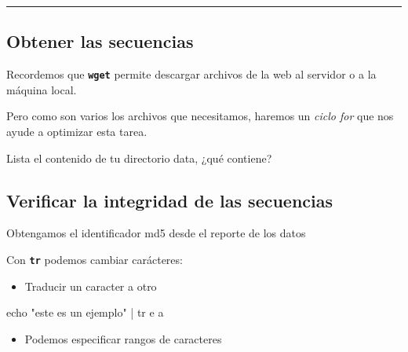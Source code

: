 \documentclass[
]{book}
\newenvironment{Shaded}{\begin{snugshade}}{\end{snugshade}}
\newcommand{\AttributeTok}[1]{\textcolor[rgb]{0.13,0.29,0.53}{#1}}
\newcommand{\ControlFlowTok}[1]{\textcolor[rgb]{0.13,0.29,0.53}{\textbf{#1}}}
\newcommand{\FunctionTok}[1]{\textcolor[rgb]{0.13,0.29,0.53}{\textbf{#1}}}
\newcommand{\KeywordTok}[1]{\textcolor[rgb]{0.13,0.29,0.53}{\textbf{#1}}}
\newcommand{\NormalTok}[1]{#1}
\newcommand{\VariableTok}[1]{\textcolor[rgb]{0.00,0.00,0.00}{#1}}
\providecommand{\tightlist}{%
  \setlength{\itemsep}{0pt}\setlength{\parskip}{0pt}}
\begin{document}
\begin{center}\rule{0.5\linewidth}{0.5pt}\end{center}

\subsection{Obtener las secuencias}\label{obtener-las-secuencias}

Recordemos que \textbf{\texttt{wget}} permite descargar archivos de la web al servidor o a la máquina local.

Pero como son varios los archivos que necesitamos, haremos un \emph{ciclo for} que nos ayude a optimizar esta tarea.

\begin{Shaded}
\end{Shaded}

Lista el contenido de tu directorio data, ¿qué contiene?

\subsection{Verificar la integridad de las secuencias}\label{verificar-la-integridad-de-las-secuencias}

Obtengamos el identificador md5 desde el reporte de los datos

Con \textbf{\texttt{tr}} podemos cambiar carácteres:

\begin{itemize}
\tightlist
\item
  Traducir un caracter a otro
\end{itemize}

\begin{Shaded}
\begin{Highlighting}[]
\NormalTok{echo "este es un ejemplo" | tr \textquotesingle{}e\textquotesingle{} \textquotesingle{}a\textquotesingle{}}
\end{Highlighting}
\end{Shaded}

\begin{itemize}
\tightlist
\item
  Podemos especificar rangos de caracteres
\end{itemize}
\end{document}
